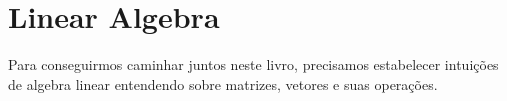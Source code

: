 \chapter{Linear Algebra}

Para conseguirmos caminhar juntos neste livro,  precisamos estabelecer intuições de algebra linear entendendo sobre matrizes, vetores e suas operações.



